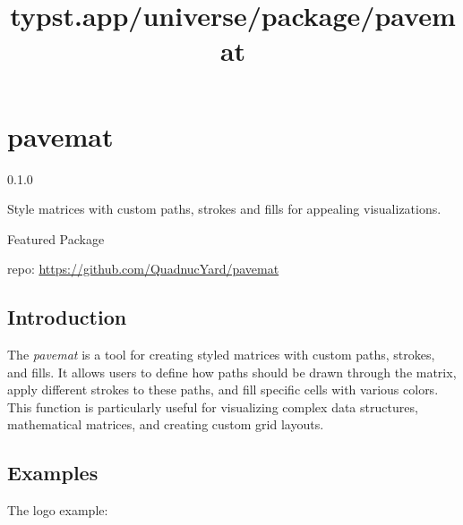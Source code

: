\title{typst.app/universe/package/pavemat}

\label{banner}
\section{pavemat}\label{pavemat}

{ 0.1.0 }

Style matrices with custom paths, strokes and fills for appealing
visualizations.

{ } Featured Package

\label{readme}
\pandocbounded{}

repo: \url{https://github.com/QuadnucYard/pavemat}

\subsection{Introduction}\label{introduction}

The \emph{pavemat} is a tool for creating styled matrices with custom
paths, strokes, and fills. It allows users to define how paths should be
drawn through the matrix, apply different strokes to these paths, and
fill specific cells with various colors. This function is particularly
useful for visualizing complex data structures, mathematical matrices,
and creating custom grid layouts.

\subsection{Examples}\label{examples}

The logo example:

\begin{Shaded}
\begin{Highlighting}[]
\NormalTok{\#\{}

\NormalTok{      "SDS(dash: \textquotesingle{}solid\textquotesingle{})DDD]WW",}
\NormalTok{    ),}
\NormalTok{    ),}
\NormalTok{    delim: "[",}
\NormalTok{  )[$mat(P, a, v, e; "", m, a, t)$]}
\NormalTok{\}}
\end{Highlighting}
\end{Shaded}

